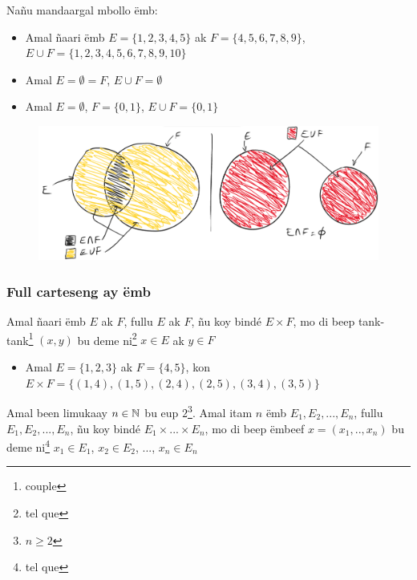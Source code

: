 \documentclass[twoside, a4paper]{article}
\begin{document}
Nañu mandaargal mbollo ëmb:
\begin{itemize}
    \item Amal  ñaari ëmb $E = \{1,2,3,4,5\}$ ak $F=\{4,5,6,7,8,9\}$, $E \cup F =\{1,2,3,4,5,6,7,8,9,10\}$
    \item Amal $E = \emptyset = F$, $E \cup F = \emptyset$
    \item Amal $E = \emptyset$, $F = \{0,1\}$, $E \cup F = \{0,1\}$
\end{itemize}

\begin{figure}[ht]
    \centering
    \includegraphics[scale = 0.5]{image/mbollo_selebe_emb.png}
    \label{fig:mbollo_selebe_emb}
\end{figure}


\subsubsection{Full carteseng ay ëmb}
\begin{tcolorbox}[enhanced jigsaw,breakable,pad at break*=1mm, colback=red!5!white,colframe=white!75!black,title= Téeki,
  watermark color=white]
 Amal ñaari ëmb $E$ ak $F$, fullu $E$ ak $F$, ñu koy bindé $E \times F$, mo di beep tank-tank\footnote{couple} $(x,y)$ bu deme ni\footnote{tel que} $x \in E$ ak $y\in F$
\end{tcolorbox} 

\begin{itemize}
    \item Amal $E=\{1,2,3\}$ ak $F = \{4,5\}$, kon $E\times F =\big\{(1,4), (1,5), (2,4), (2,5), (3,4), (3,5)\big\}$ 
\end{itemize}


\begin{tcolorbox}[enhanced jigsaw,breakable,pad at break*=1mm, colback=red!5!white,colframe=white!75!black,title= Téeki,
  watermark color=white]
 Amal been limukaay $n \in \mathbb{N}$ bu eup $2$\footnote{$n\geq 2$}. Amal itam $n$ ëmb $E_1, E_2, ..., E_n$, fullu $E_1, E_2, ..., E_n$, ñu koy bindé $E_1 \times ... \times E_n$, mo di beep ëmbeef $x = (x_1,..,x_n)$ bu deme ni\footnote{tel que} $x_1 \in E_1$, $x_2 \in E_2$, ..., $x_n \in E_n$
\end{tcolorbox} 
\end{document}
